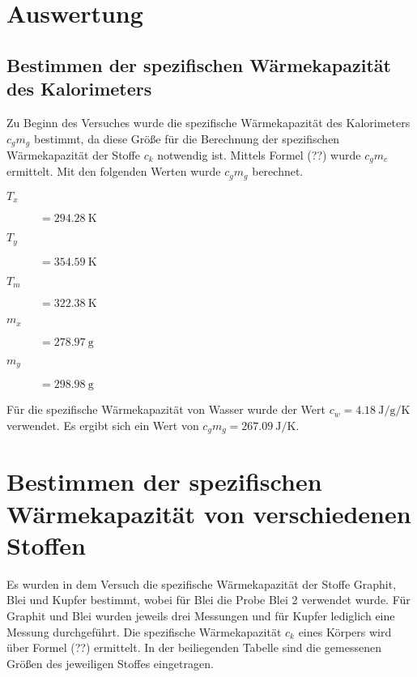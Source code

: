 


\section{Auswertung}

\subsection{Bestimmen der spezifischen Wärmekapazität des Kalorimeters}

Zu Beginn des Versuches wurde die spezifische Wärmekapazität des Kalorimeters
$c_gm_g$ bestimmt, da diese Größe für die Berechnung der spezifischen
Wärmekapazität der Stoffe $c_k$ notwendig ist. Mittels Formel (??) wurde
$c_gm_c$ ermittelt. Mit den folgenden Werten wurde $c_gm_g$ berechnet.

\begin{description}
  \item[$T_x$]$ = \SI{294,28}{\kelvin}$
  \item[$T_y$]$ = \SI{354,59}{\kelvin}$
  \item[$T_m$]$ = \SI{322,38}{\kelvin}$
  \item[$m_x$]$ = \SI{278,97}{\gram}$
  \item[$m_y$]$ = \SI{298,98}{\gram}$
\end{description}

Für die spezifische Wärmekapazität von Wasser wurde der Wert $c_w =
\SI{4,18}{\joule\per\gram\per\kelvin}$ verwendet.
Es ergibt sich ein Wert von $c_gm_g = \SI{267,09}{\joule\per\kelvin}$.

\section{Bestimmen der spezifischen Wärmekapazität von verschiedenen Stoffen}

Es wurden in dem Versuch die spezifische Wärmekapazität der Stoffe Graphit,
Blei und Kupfer bestimmt, wobei für Blei die Probe Blei 2 verwendet wurde.
Für Graphit und Blei wurden jeweils drei Messungen und für Kupfer lediglich eine
Messung durchgeführt. Die spezifische Wärmekapazität $c_k$ eines Körpers
wird über Formel (??) ermittelt. In der beiliegenden Tabelle sind die gemessenen
Größen des jeweiligen Stoffes eingetragen.

